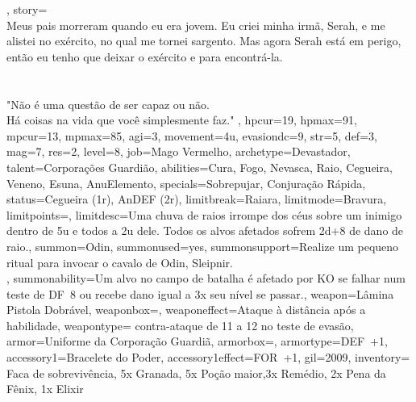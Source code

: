 {{\begin{multicols}{2}
		\end{multicols}
		\vspace*{-0.9cm}
	},
	story={\\
		Meus pais morreram quando eu era jovem.
		Eu criei minha irmã, Serah, e me alistei no exército, no qual me tornei sargento.
		Mas agora Serah está em perigo, então eu tenho que deixar o exército e para encontrá-la. \\\\\\
		"Não é uma questão de ser capaz ou não.\\Há coisas na vida que você simplesmente faz."
	},
	hpcur=19, hpmax=91, mpcur=13, mpmax=85, agi=3, movement=4u, evasiondc=9, str=5, def=3, mag=7, res=2, 
	level=8, job=Mago Vermelho, archetype=Devastador\phantom{1234567}, talent=Corporações Guardião,
	abilities={Cura, Fogo, Nevasca, Raio, Cegueira,\\ Veneno, Esuna, AnuElemento},
	specials={Sobrepujar, Conjuração Rápida}, status={Cegueira (1r), AnDEF (2r)},
	limitbreak=Raiara, limitmode=Bravura, limitpoints=\ofcslimitbarfilled, 
	limitdesc={Uma chuva de raios irrompe dos céus sobre um inimigo dentro de 5u e todos a 2u dele. Todos os alvos afetados sofrem 2d+8 de dano de raio.},
	summon=Odin, summonused=yes, summonsupport={Realize um pequeno ritual para invocar o cavalo de Odin, Sleipnir.\\}, summonability={Um alvo no campo de batalha é afetado por KO se falhar num teste de DF~8 ou recebe dano igual a 3x seu nível se passar.},
	weapon=Lâmina Pistola Dobrável, weaponbox=\ofcsweaponboxexpert, weaponeffect=Ataque à distância após a habilidade, weapontype= contra-ataque de 11 a 12 no teste de evasão, armor=Uniforme da Corporação Guardiã, armorbox=\ofcsarmorboxbeginner, armortype=DEF~+1, accessory1=Bracelete do Poder, accessory1effect=FOR~+1,
	gil=2009, inventory={\\Faca de sobrevivência, 5x Granada, 5x Poção maior,\newline3x Remédio, 2x Pena da Fênix, 1x Elixir}
}
%
\clearpage
